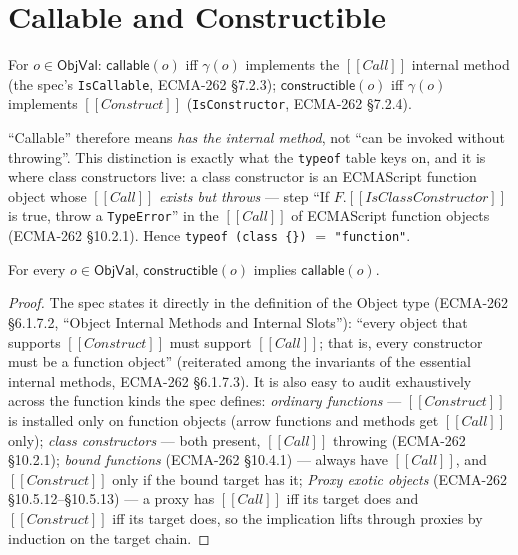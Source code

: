 \documentclass[11pt]{article}
\newcommand{\ObjVal}{\mathsf{ObjVal}}
\newcommand{\realize}{\gamma}
\newcommand{\ecma}[1]{ECMA-262 \S#1}
\newcommand{\intm}[1]{[[#1]]}
\begin{document}
\section{Callable and Constructible}
\label{sec:call}

\begin{definition}
\label{def:callable}
For $o \in \ObjVal$:
$\mathsf{callable}(o)$ iff $\realize(o)$ implements the $\intm{Call}$
internal method (the spec's \texttt{IsCallable}, \ecma{7.2.3});
$\mathsf{constructible}(o)$ iff $\realize(o)$ implements
$\intm{Construct}$ (\texttt{IsConstructor}, \ecma{7.2.4}).
\end{definition}

``Callable'' therefore means \emph{has the internal method}, not ``can be
invoked without throwing''. This distinction is exactly what the
\texttt{typeof} table keys on, and it is where class constructors live:
a class constructor is an ECMAScript function object whose $\intm{Call}$
\emph{exists but throws} — step ``If $F$.$\intm{IsClassConstructor}$ is
\textsf{true}, throw a \texttt{TypeError}'' in the $\intm{Call}$ of
ECMAScript function objects (\ecma{10.2.1}). Hence
\texttt{typeof (class \{\})} $=$ \texttt{"function"}.

\begin{theorem}
\label{thm:ctor-call}
For every $o \in \ObjVal$, $\mathsf{constructible}(o)$ implies
$\mathsf{callable}(o)$.
\end{theorem}
\begin{proof}
The spec states it directly in the definition of the Object type
(\ecma{6.1.7.2}, ``Object Internal Methods and Internal Slots''):
``every object that supports $\intm{Construct}$ must support
$\intm{Call}$; that is, every constructor must be a function object''
(reiterated among the invariants of the essential internal methods,
\ecma{6.1.7.3}). It is also easy to audit exhaustively across the
function kinds the spec defines:
\emph{ordinary functions} — $\intm{Construct}$ is installed only on
function objects (arrow functions and methods get $\intm{Call}$ only);
\emph{class constructors} — both present, $\intm{Call}$ throwing
(\ecma{10.2.1});
\emph{bound functions} (\ecma{10.4.1}) — always have $\intm{Call}$, and
$\intm{Construct}$ only if the bound target has it;
\emph{Proxy exotic objects} (\ecma{10.5.12}--\S10.5.13) — a proxy has
$\intm{Call}$ iff its target does and $\intm{Construct}$ iff its target
does, so the implication lifts through proxies by induction on the
target chain.
\end{proof}
\end{document}
